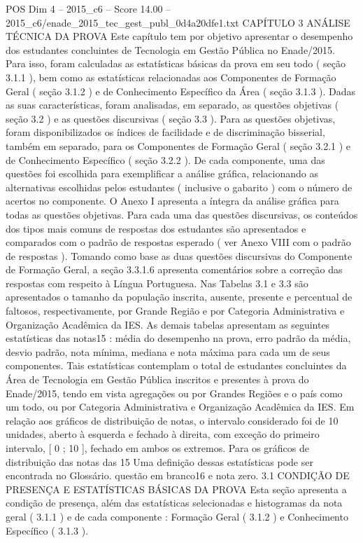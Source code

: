 \begin{textsample}{POS Dim 4 – 2015\_c6 – Score 14.00 – 2015\_c6/enade\_2015\_tec\_gest\_publ\_0d4a20dfe1.txt}  \label{ex:f4_pos_022}
CAPÍTULO 3 ANÁLISE TÉCNICA DA PROVA Este capítulo tem por objetivo apresentar o desempenho dos estudantes concluintes de Tecnologia em Gestão Pública no Enade/2015.
Para isso, foram calculadas as estatísticas básicas da prova em seu todo ( seção 3.1.1 ), bem como as estatísticas relacionadas aos Componentes de Formação Geral ( seção 3.1.2 ) e de Conhecimento Específico da Área ( seção 3.1.3 ).
Dadas as suas características, foram analisadas, em separado, as questões objetivas ( seção 3.2 ) e as questões discursivas ( seção 3.3 ).
Para as questões objetivas, foram disponibilizados os índices de facilidade e de discriminação bisserial, também em separado, para os Componentes de Formação Geral ( seção 3.2.1 ) e de Conhecimento Específico ( seção 3.2.2 ).
De cada componente, uma das questões foi escolhida para exemplificar a análise gráfica, relacionando as alternativas escolhidas pelos estudantes ( inclusive o gabarito ) com o número de acertos no componente.
O Anexo I apresenta a íntegra da análise gráfica para todas as questões objetivas.
Para cada uma das questões discursivas, os conteúdos dos tipos mais comuns de respostas dos estudantes são apresentados e comparados com o padrão de respostas esperado ( ver Anexo VIII com o padrão de respostas ).
Tomando como base as duas questões discursivas do Componente de Formação Geral, a seção 3.3.1.6 apresenta comentários sobre a correção das respostas com respeito à Língua Portuguesa.
Nas Tabelas 3.1 e 3.3 são apresentados o tamanho da população inscrita, ausente, presente e percentual de faltosos, respectivamente, por Grande Região e por Categoria Administrativa e Organização Acadêmica da IES.
As demais tabelas apresentam as seguintes estatísticas das notas15 : média do desempenho na prova, erro padrão da média, desvio padrão, nota mínima, mediana e nota máxima para cada um de seus componentes.
Tais estatísticas contemplam o total de estudantes concluintes da Área de Tecnologia em Gestão Pública inscritos e presentes à prova do Enade/2015, tendo em vista agregações ou por Grandes Regiões e o país como um todo, ou por Categoria Administrativa e Organização Acadêmica da IES.
Em relação aos gráficos de distribuição de notas, o intervalo considerado foi de 10 unidades, aberto à esquerda e fechado à direita, com exceção do primeiro intervalo, [ 0 ; 10 ], fechado em ambos os extremos.
Para os gráficos de distribuição das notas das 15 Uma definição dessas estatísticas pode ser encontrada no Glossário. questão em branco16 e nota zero. 3.1 CONDIÇÃO DE PRESENÇA E ESTATÍSTICAS BÁSICAS DA PROVA Esta seção apresenta a condição de presença, além das estatísticas selecionadas e histogramas da nota geral ( 3.1.1 ) e de cada componente : Formação Geral ( 3.1.2 ) e Conhecimento Específico ( 3.1.3 ).

\end{textsample}
